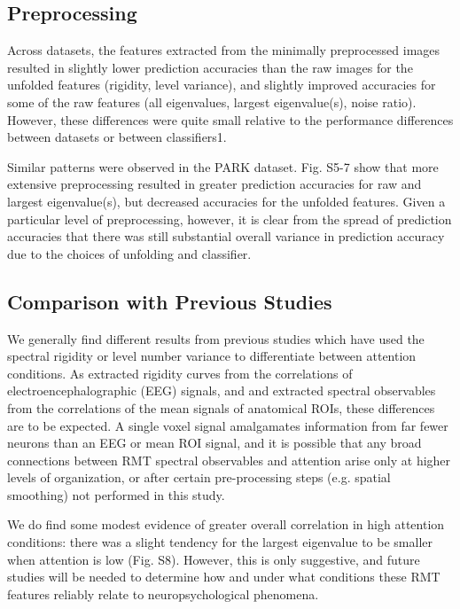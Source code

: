 \documentclass[NETN,manuscript]{stjour-new}
\begin{document}
\subsection{Preprocessing}
Across datasets, the features extracted from the minimally preprocessed images resulted in slightly
lower prediction accuracies than the raw images for the unfolded features (rigidity, level
variance), and slightly improved accuracies for some of the raw features (all eigenvalues, largest
eigenvalue(s), noise ratio). However, these differences were quite small relative to the performance
differences between datasets or between classifiers1.

Similar patterns were observed in the PARK dataset. Fig. S5-7 show that more extensive preprocessing
resulted in greater prediction accuracies for raw and largest eigenvalue(s), but decreased
accuracies for the unfolded features. Given a particular level of preprocessing, however, it is
clear from the spread of prediction accuracies that there was still substantial overall variance in
prediction accuracy due to the choices of unfolding and classifier.

\subsection{Comparison with Previous Studies}

We generally find different results from previous studies
\citep{sebaRandomMatrixAnalysis2003,wangRandomMatrixTheory2016,matharooSpontaneousBackpainAlters2020}
which have used the spectral rigidity or level number variance to differentiate between attention
conditions. As \cite{sebaRandomMatrixAnalysis2003} extracted rigidity curves from the correlations
of electroencephalographic (EEG) signals, and \cite{wangRandomMatrixTheory2016} and
\cite{matharooSpontaneousBackpainAlters2020} extracted spectral observables from the correlations of
the mean signals of anatomical ROIs, these differences are to be expected. A single voxel signal
amalgamates information from far fewer neurons than an EEG or mean ROI signal, and it is possible
that any broad connections between RMT spectral observables and attention arise only at higher
levels of organization, or after certain pre-processing steps (e.g. spatial smoothing) not performed
in this study.

We do find some modest evidence of greater overall correlation in high attention conditions: there
was a slight tendency for the largest eigenvalue to be smaller when attention is low (Fig. S8).
However, this is only suggestive, and future studies will be needed to determine how and under what
conditions these RMT features reliably relate to neuropsychological phenomena.
\end{document}
